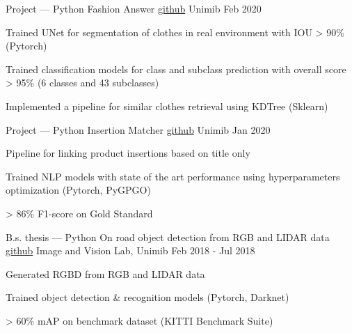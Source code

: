 

\begin{cventries}


  \cventry
  {Project --- Python}
  {Fashion Answer \tiny \href{https://github.com/gianscarpe/fashion-answer}{github}}
  {Unimib}
  {Feb 2020}
  {
    \begin{cvitems} %
    \item Trained UNet for segmentation of clothes in real environment with IOU
      > 90\% (Pytorch)
    \item Trained classification models for class and subclass prediction with
      overall score > 95\% (6 classes and 43 subclasses)
    \item Implemented a pipeline for similar clothes retrieval using KDTree (Sklearn)
    \end{cvitems}
  }
  

  \cventry
  {Project --- Python}
  {Insertion Matcher \tiny \href{https://github.com/belerico/insertion-matcher}{github}}
  {Unimib}
  {Jan 2020}
  {
    \begin{cvitems} %
    \item Pipeline for linking product insertions based on title only
    \item Trained NLP models with state of the art performance using hyperparameters optimization (Pytorch, PyGPGO)
    \item > 86\% F1-score on Gold Standard
    \end{cvitems}
  }


  \cventry
  {B.s. thesis --- Python} %
  {On road object detection from RGB and LIDAR data \tiny \href{https://github.com/gianscarpe/bachelor_thesis}{github}} %
  {Image and Vision Lab, Unimib} %
  {Feb 2018 - Jul 2018} %
  {
    \begin{cvitems} %
    \item Generated RGBD from RGB and LIDAR data
    \item Trained object detection \& recognition models (Pytorch, Darknet)
    \item > 60\% mAP on benchmark dataset (KITTI Benchmark Suite)
    \end{cvitems}
  }



\end{cventries}
